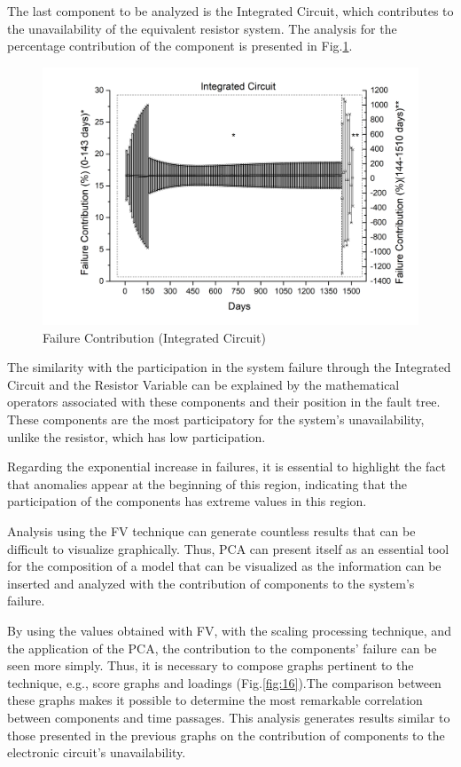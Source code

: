 \documentclass{ws-m3as}
\begin{document}
The last component to be analyzed is the Integrated Circuit, which contributes to the unavailability of the equivalent resistor system. The analysis for the percentage contribution of the component is presented in Fig.\ref{fig:14}.

\begin{figure} [H]
	\centering
	\includegraphics[width=0.8\linewidth]{Figures/ICFull}
	\caption{Failure Contribution (Integrated Circuit)}
	\label{fig:icfull}
	\label{fig:14}
\end{figure}

The similarity with the participation in the system failure through the Integrated Circuit and the Resistor Variable can be explained by the mathematical operators associated with these components and their position in the fault tree. These components are the most participatory for the system's unavailability, unlike the resistor, which has low participation. 

Regarding the exponential increase in failures, it is essential to highlight the fact that anomalies appear at the beginning of this region, indicating that the participation of the components has extreme values in this region.

Analysis using the FV technique can generate countless results that can be difficult to visualize graphically. Thus, PCA can present itself as an essential tool for the composition of a model that can be visualized as the information can be inserted and analyzed with the contribution of components to the system's failure.

By using the values obtained with FV, with the scaling processing technique, and the application of the PCA, the contribution to the components' failure can be seen more simply. Thus, it is necessary to compose graphs pertinent to the technique, e.g., score graphs and loadings (Fig.\ref{fig:16}).The comparison between these graphs makes it possible to determine the most remarkable correlation between components and time passages. This analysis generates results similar to those presented in the previous graphs on the contribution of components to the electronic circuit's unavailability.
\end{document}
